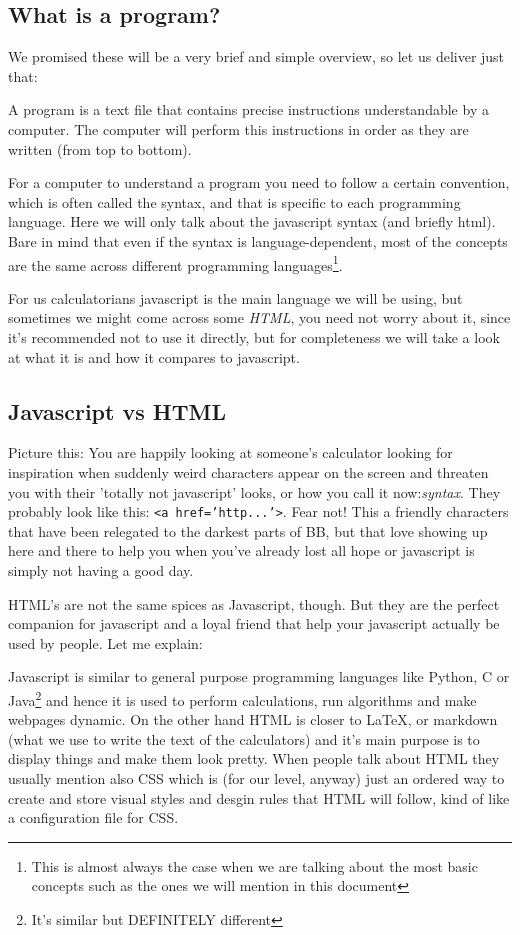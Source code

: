 \subsection{What is a program?} 
\label{sub:program}
We promised these will be a very brief and simple overview, so let us deliver just that:

A program is a text file that contains precise instructions understandable by a computer. The computer will perform this instructions in order as they are written (from top to bottom). 

For a computer to understand a program you need to follow a certain convention, which is often called the syntax, and that is specific to each programming language. Here we will only talk about the javascript syntax (and briefly html). Bare in mind that even if the syntax is language-dependent, most of the concepts are the same across different programming languages\footnote{This is almost always the case when we are talking about the most basic concepts such as the ones we will mention in this document}.

For us calculatorians javascript is the main language we will be using, but sometimes we might come across some \textit{HTML}, you need not worry about it, since it's recommended not to use it directly, but for completeness we will take a look at what it is and how it compares to javascript.
\subsection{Javascript vs HTML}
\label{sub:jsHtml}
Picture this: You are happily looking at someone's calculator looking for inspiration when suddenly weird characters appear on the screen and threaten you with their 'totally not javascript' looks, or how you call it now:\textit{syntax}. They probably look like this: \texttt{<a href='http...'>}. Fear not! This a friendly characters that have been relegated to the darkest parts of BB, but that love showing up here and there to help you when you've already lost all hope or javascript is simply not having a good day. 

HTML's are not the same spices as Javascript, though. But they are the perfect companion for javascript and a loyal friend that help your javascript actually be used by people. Let me explain:

Javascript is similar to general purpose programming languages like Python, C or Java\footnote{It's similar but DEFINITELY different} and hence it is used to perform calculations, run algorithms and make webpages dynamic. On the other hand HTML is closer to \LaTeX, or markdown (what we use to write the text of the calculators) and it's main purpose is to display things and make them look pretty. When people talk about HTML they usually mention also CSS which is (for our level, anyway) just an ordered way to create and store visual styles and desgin rules that HTML will follow, kind of like a configuration file for CSS.

